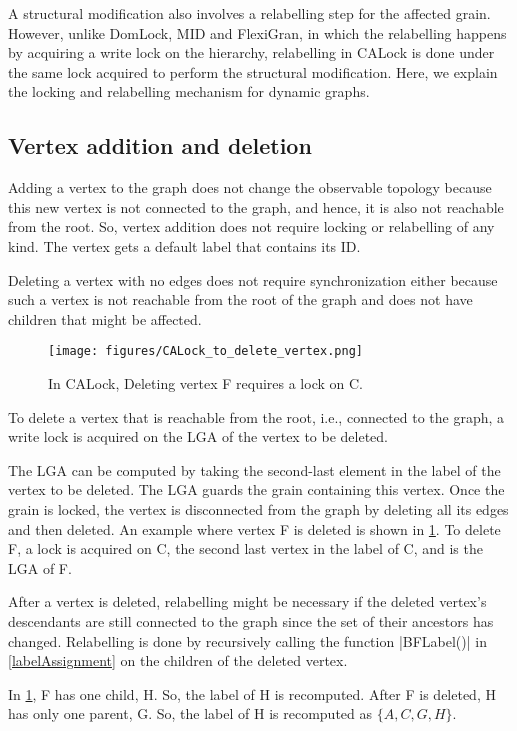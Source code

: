 A structural modification also involves a relabelling step for the affected grain. However, unlike DomLock, MID and FlexiGran, in which the relabelling happens by acquiring a write lock on the hierarchy, relabelling in CALock is done under the same lock acquired to perform the structural modification. 
Here, we explain the locking and relabelling mechanism for dynamic graphs.

\subsection{Vertex addition and deletion}
Adding a vertex to the graph does not change the observable topology because this new vertex is not connected to the graph, and hence, it is also not reachable from the root. 
So, vertex addition does not require locking or relabelling of any kind. The vertex gets a default label that contains its ID. 

Deleting a vertex with no edges does not require synchronization either because such a vertex is not reachable from the root of the graph and does not have children that might be affected.

\begin{figure}[h]
	\centering
	\captionsetup{justification=centering}
	\texttt{[image: figures/CALock\_to\_delete\_vertex.png]}
	\caption{In CALock, Deleting vertex F requires a lock on C.}
	\label{fig:calockdelete}
\end{figure}

To delete a vertex that is reachable from the root, i.e., connected to the graph, a write lock is acquired on the LGA of the vertex to be deleted. 

The LGA can be computed by taking the second-last element in the label of the vertex to be deleted. The LGA guards the grain containing this vertex. 
Once the grain is locked, the vertex is disconnected from the graph by deleting all its edges and then deleted. An example where vertex F is deleted is shown in \cref{fig:calockdelete}. To delete F, a lock is acquired on C, the second last vertex in the label of C, and is the LGA of F.

After a vertex is deleted, relabelling might be necessary if the deleted vertex's descendants are still connected to the graph since the set of their ancestors has changed. Relabelling is done by recursively calling the function \inline|BFLabel()| in \cref{labelAssignment} on the children of the deleted vertex. 

In \cref{fig:calockdelete}, F has one child, H. So, the label of H is recomputed. After F is deleted, H has only one parent, G. So, the label of H is recomputed as $\{A, C, G, H\}$.



